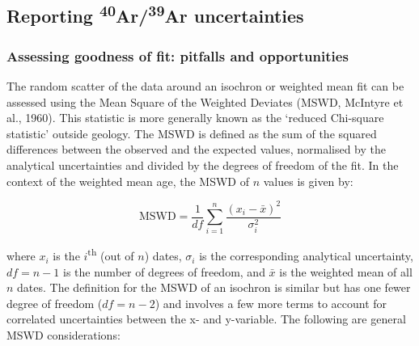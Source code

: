 \documentclass{article}
\begin{document}
\setcounter{section}{4}
\setcounter{subsection}{0}
\subsection{Reporting \textsuperscript{40}Ar/\textsuperscript{39}Ar uncertainties}
\label{sec:reportinguncertainties}

\subsubsection{Assessing goodness of fit: pitfalls and opportunities}
\label{sec:MSWD}

The random scatter of the data around an isochron or weighted mean fit
can be assessed using the Mean Square of the Weighted Deviates (MSWD,
McIntyre et al., 1960). This statistic is more generally known as the
`reduced Chi-square statistic' outside geology. The MSWD is defined as
the sum of the squared differences between the observed and the
expected values, normalised by the analytical uncertainties and
divided by the degrees of freedom of the fit.  In the context of the
weighted mean age, the MSWD of $n$ values is given by:

\begin{equation}
  \mathrm{MSWD} = \frac{1}{df} \sum\limits_{i=1}^{n} \frac{\left(x_i
    - \bar{x}\right)^2}{\sigma_i^2}
  \label{eq:MSWD}
\end{equation}

\noindent where $x_i$ is the $i$\textsuperscript{th} (out of $n$)
dates, $\sigma_i$ is the corresponding analytical uncertainty, $df = n
- 1$ is the number of degrees of freedom, and $\bar{x}$ is the
weighted mean of all $n$ dates. The definition for the MSWD of an
isochron is similar but has one fewer degree of freedom ($df = n - 2$)
and involves a few more terms to account for correlated uncertainties
between the x- and y-variable. The following are general MSWD
considerations:
\end{document}
